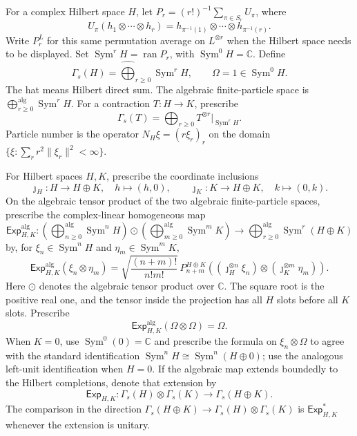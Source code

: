 \begin{definition}
For a complex Hilbert space $H$, let
$P_r=(r!)^{-1}\sum_{\pi\in S_r}U_\pi$, where
\[
 U_\pi(h_1\otimes\cdots\otimes h_r)
 =h_{\pi^{-1}(1)}\otimes\cdots\otimes h_{\pi^{-1}(r)}.
\]
Write $P_r^L$ for this same permutation average on $L^{\otimes r}$ when
the Hilbert space needs to be displayed. Set
$\operatorname{Sym}^rH=\operatorname{ran}P_r$, with
$\operatorname{Sym}^0H=\mathbb C$. Define
\[
 \Gamma_s(H)=\widehat{\bigoplus}_{r\geq0}\operatorname{Sym}^rH,
 \qquad\Omega=1\in\operatorname{Sym}^0H.
\]
The hat means Hilbert direct sum. The algebraic finite-particle space is
$\bigoplus_{r\geq0}^{\mathrm{alg}}\operatorname{Sym}^rH$.
For a contraction $T:H\to K$, prescribe
\[
 \Gamma_s(T)=\bigoplus_{r\geq0}
 T^{\otimes r}|_{\operatorname{Sym}^rH}.
\]
Particle number is the operator $N_H\xi=(r\xi_r)_r$ on the domain
$\{\xi:\sum_r r^2\|\xi_r\|^2<\infty\}$.

For Hilbert spaces $H,K$, prescribe the coordinate inclusions
\[
 \jmath_H:H\longrightarrow H\oplus K,\quad h\longmapsto(h,0),
 \qquad
 \jmath_K:K\longrightarrow H\oplus K,\quad k\longmapsto(0,k).
\]
On the algebraic tensor product of the two algebraic finite-particle spaces,
prescribe the complex-linear homogeneous map
\[
 \mathsf{Exp}^{\mathrm{alg}}_{H,K}:
 \left(\bigoplus_{n\geq0}^{\mathrm{alg}}\operatorname{Sym}^nH\right)
 \odot
 \left(\bigoplus_{m\geq0}^{\mathrm{alg}}\operatorname{Sym}^mK\right)
 \longrightarrow
 \bigoplus_{r\geq0}^{\mathrm{alg}}\operatorname{Sym}^r(H\oplus K)
\]
by, for $\xi_n\in\operatorname{Sym}^nH$ and
$\eta_m\in\operatorname{Sym}^mK$,
\[
 \mathsf{Exp}^{\mathrm{alg}}_{H,K}(\xi_n\otimes\eta_m)
 =\sqrt{\frac{(n+m)!}{n!m!}}\,
 P^{H\oplus K}_{n+m}
 \left((\jmath_H^{\otimes n}\xi_n)
 \otimes(\jmath_K^{\otimes m}\eta_m)\right).
\]
Here $\odot$ denotes the algebraic tensor product over $\mathbb C$.
The square root is the positive real one, and the tensor inside the
projection has all $H$ slots before all $K$ slots. Prescribe
\[
 \mathsf{Exp}^{\mathrm{alg}}_{H,K}(\Omega\otimes\Omega)=\Omega.
\]
When $K=0$, use $\operatorname{Sym}^0(0)=\mathbb C$ and prescribe the formula
on $\xi_n\otimes\Omega$ to agree with the standard identification
$\operatorname{Sym}^nH\cong\operatorname{Sym}^n(H\oplus0)$; use the
analogous left-unit identification when $H=0$.
If the algebraic map extends boundedly to the Hilbert completions, denote
that extension by
\[
 \mathsf{Exp}_{H,K}:\Gamma_s(H)\otimes\Gamma_s(K)
 \longrightarrow\Gamma_s(H\oplus K).
\]
The comparison in the direction
$\Gamma_s(H\oplus K)\to\Gamma_s(H)\otimes\Gamma_s(K)$ is
$\mathsf{Exp}_{H,K}^*$ whenever the extension is unitary.
\end{definition}
